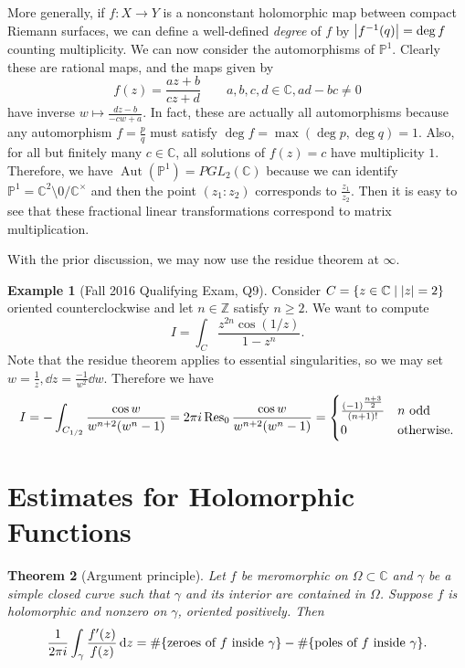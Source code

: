 \documentclass[leqno, openany]{memoir}
\newtheorem{thm}{Theorem}[section]
\theoremstyle{definition}
\newtheorem{exm}[thm]{Example}
\theoremstyle{remark}
\theoremstyle{plain}
\theoremstyle{definition}
\theoremstyle{remark}
\newcommand{\C}{\mathbb{C}}
\newcommand{\Z}{\mathbb{Z}}
\renewcommand{\P}{\mathbb{P}}
\DeclareMathOperator{\Aut}{Aut}
\begin{document}
More generally, if $f \colon X \to Y$ is a nonconstant holomorphic map between compact Riemann surfaces, we can define a well-defined \textit{degree} of $f$ by $\abs{f^{-1}(q)} = \deg f$ counting multiplicity. We can now consider the automorphisms of $\P^1$. Clearly these are rational maps, and the maps given by
\[ f(z) = \frac{az + b}{cz + d} \qquad a,b,c,d \in \C, ad-bc \neq 0 \]
have inverse $w \mapsto \frac{dz - b}{-cw + a}$. In fact, these are actually all automorphisms because any automorphism $f = \frac{p}{q}$ must satisfy $\deg f = \max (\deg p, \deg q) = 1$. Also, for all but finitely many $c \in \C$, all solutions of $f(z) = c$ have multiplicity $1$. Therefore, we have $\Aut(\P^1) = PGL_2(\C)$ because we can identify $\P^1 = \C^2 \setminus \qty{0} / \C^{\times}$ and then the point $(z_1 : z_2)$ corresponds to $\frac{z_1}{z_2}$. Then it is easy to see that these fractional linear transformations correspond to matrix multiplication.

With the prior discussion, we may now use the residue theorem at $\infty$.
\begin{exm}[Fall 2016 Qualifying Exam, Q9]
    Consider $C = \qty{z \in \C \mid \abs{z} = 2}$ oriented counterclockwise and let $n \in \Z$ satisfy $n \geq 2$. We want to compute
    \[ I = \int_C \frac{z^{2n} \cos(1/z)}{1-z^n}. \]
    Note that the residue theorem applies to essential singularities, so we may set $w = \frac{1}{z}, \dd{z} = \frac{-1}{w^2} \dd{w}$. Therefore we have
    \[ I = - \int_{C_{1/2}} \frac{\cos w}{w^{n+2}(w^n - 1)} = 2 \pi i \Res_0 \frac{\cos w}{w^{n+2}(w^n - 1)} = \begin{cases}
        \frac{{(-1)}^{\frac{n+3}{2}}}{(n+1)!} & n \text{ odd} \\
        0 & \text{otherwise}.
    \end{cases} \]
\end{exm}

\section{Estimates for Holomorphic Functions}%
\label{sec:estimates_for_holomorphic_functions}

\begin{thm}[Argument principle]
    Let $f$ be meromorphic on $\Omega \subset \C$ and $\gamma$ be a simple closed curve such that $\gamma$ and its interior are contained in $\Omega$. Suppose $f$ is holomorphic and nonzero on $\gamma$, oriented positively. Then
    \[ \frac{1}{2 \pi i} \int_{\gamma} \frac{f'(z)}{f(z)} \dd{z} = \#\qty{\text{zeroes of $f$ inside $\gamma$}} - \#\qty{\text{poles of $f$ inside $\gamma$}}. \]
\end{thm}
\end{document}
